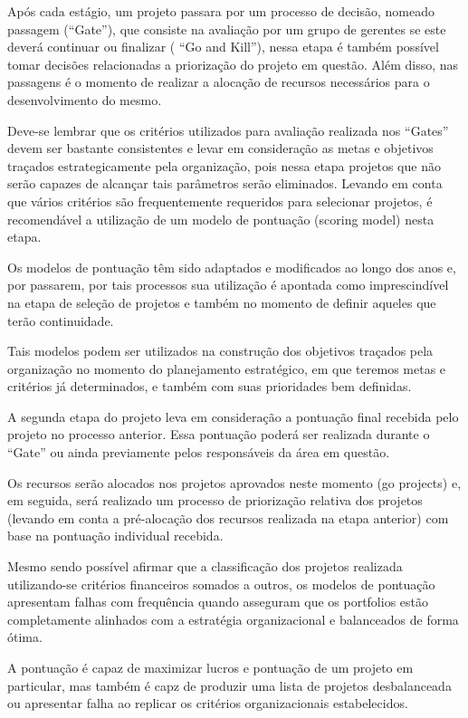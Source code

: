 \documentclass[12pt,a4paper,ruledheader,tocpage=prefix,floatnumber=continuous,pagestart=folhaderosto,font=times]{abnt}
\begin{document}
Após cada estágio, um projeto passara por um processo de decisão, nomeado passagem (``Gate''), que consiste na avaliação por um grupo de gerentes se este 
deverá continuar ou finalizar ( ``Go and Kill''), nessa etapa é também possível tomar decisões relacionadas a priorização do projeto em questão. Além disso,
nas passagens é o momento de realizar a alocação de recursos necessários para o desenvolvimento do mesmo.

Deve-se lembrar que os critérios utilizados para avaliação realizada nos ``Gates'' devem ser bastante consistentes e levar em consideração as metas e objetivos
traçados estrategicamente pela organização, pois nessa etapa projetos que não serão capazes de alcançar tais parâmetros serão eliminados. Levando em conta
que vários critérios são frequentemente requeridos para selecionar projetos, é recomendável a utilização de um modelo de pontuação (scoring model) nesta etapa.

Os modelos de pontuação têm sido adaptados e modificados ao longo dos anos e, por passarem, por tais processos sua utilização é apontada como imprescindível 
na etapa de seleção de projetos e também no momento de definir aqueles que terão continuidade. 

Tais modelos podem ser utilizados na construção dos objetivos traçados pela organização no momento do planejamento estratégico, em que teremos metas e 
critérios já determinados, e também com suas prioridades bem definidas.

A segunda etapa do projeto leva em consideração a pontuação final recebida pelo projeto no processo anterior. Essa pontuação poderá ser realizada durante o
``Gate'' ou ainda previamente pelos responsáveis da área em questão. 

Os recursos serão alocados nos projetos aprovados neste momento (go projects) e, em seguida, será realizado um processo de priorização relativa dos 
projetos (levando em conta a pré-alocação dos recursos realizada na etapa anterior) com base na pontuação individual recebida.

Mesmo sendo possível afirmar que a classificação dos projetos realizada utilizando-se critérios financeiros somados a outros, os modelos de pontuação
apresentam falhas com frequência quando asseguram que os portfolios estão completamente alinhados com a estratégia organizacional e balanceados de forma ótima.

A pontuação é capaz de maximizar lucros e pontuação de um projeto em particular, mas também é capz de produzir uma lista de projetos desbalanceada ou apresentar
falha ao replicar os critérios organizacionais estabelecidos.
\end{document}
